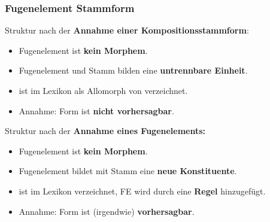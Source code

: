 \begin{frame}
\frametitle{Fugenelement \vs Stammform}

\begin{minipage}{.78\textwidth}
	
Struktur nach der \textbf{Annahme einer Kompositionsstammform}:

\begin{itemize}	
	\item Fugenelement ist \textbf{kein Morphem}.

	\item Fugenelement und Stamm bilden eine \textbf{untrennbare Einheit}.
	
	\item {} ist im Lexikon als Allomorph von  verzeichnet.
	
	\item Annahme: Form  ist \textbf{nicht vorhersagbar}.
\end{itemize}

\end{minipage}
\begin{minipage}{.21\textwidth}	
	\centering	
\end{minipage}

\begin{minipage}{.76\textwidth}

\pause 

\medskip 

Struktur nach der \textbf{Annahme eines Fugenelements:}

\begin{itemize}	
	\item Fugenelement ist \textbf{kein Morphem}.
	
	\item Fugenelement bildet mit Stamm eine \textbf{neue Konstituente}.
	
	\item {} ist im Lexikon verzeichnet, FE  wird durch eine \textbf{Regel} hinzugefügt.
	
	\item Annahme: Form  ist (irgendwie) \textbf{vorhersagbar}.
\end{itemize}
	
\end{minipage}
\begin{minipage}{.23\textwidth}	
	\centering	
	\scalebox{.8}{
	\begin{forest}
		[N
		[N 
		[Kind]
		[FE
		[\alertred{-er}]
		]
		]
		[N
		[Wagen]
		]
		]		
	\end{forest}
	}
\end{minipage}

\end{frame}


